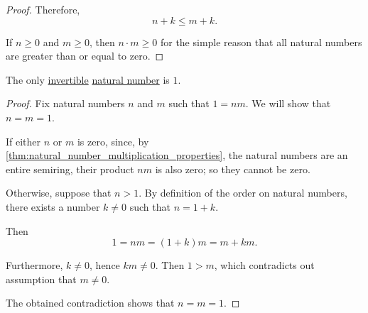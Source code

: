 \begin{proof}
  Therefore,
  \begin{equation*}
    n + k \leq m + k.
  \end{equation*}

   If \( n \geq 0 \) and \( m \geq 0 \), then \( n \cdot m \geq 0 \) for the simple reason that all natural numbers are greater than or equal to zero.
\end{proof}

\begin{proposition}\label{thm:natural_number_multiplicative_invertibility}
  The only \hyperref[def:divisibility/invertible]{invertible} \hyperref[def:natural_numbers]{natural number} is \( 1 \).
\end{proposition}
\begin{proof}
  Fix natural numbers \( n \) and \( m \) such that \( 1 = nm \). We will show that \( n = m = 1 \).

  If either \( n \) or \( m \) is zero, since, by \cref{thm:natural_number_multiplication_properties}, the natural numbers are an entire semiring, their product \( nm \) is also zero; so they cannot be zero.

  Otherwise, suppose that \( n > 1 \). By definition of the order on natural numbers, there exists a number \( k \neq 0 \) such that \( n = 1 + k \).

  Then
  \begin{equation*}
    1 = nm = (1 + k)m = m + km.
  \end{equation*}

  Furthermore, \( k \neq 0 \), hence \( km \neq 0 \). Then \( 1 > m \), which contradicts out assumption that \( m \neq 0 \).

  The obtained contradiction shows that \( n = m = 1 \).
\end{proof}

